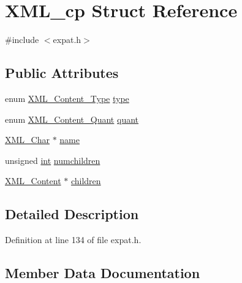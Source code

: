 \hypertarget{struct_x_m_l__cp}{}\section{X\+M\+L\+\_\+cp Struct Reference}
\label{struct_x_m_l__cp}


{\ttfamily \#include $<$expat.\+h$>$}

\subsection*{Public Attributes}
\begin{DoxyCompactItemize}
\item 
enum \hyperlink{amiga_2include_2libraries_2expat_8h_abb42ccef87efb634487d28753d14b473}{X\+M\+L\+\_\+\+Content\+\_\+\+Type} \hyperlink{struct_x_m_l__cp_a98deeadbd7d0e20387a29f9030c2a397}{type}
\item 
enum \hyperlink{amiga_2include_2libraries_2expat_8h_a63f73d88e3afb7c5fe7d33bbb193b024}{X\+M\+L\+\_\+\+Content\+\_\+\+Quant} \hyperlink{struct_x_m_l__cp_a85e6c8f3118df403b0d15491c93ae9e7}{quant}
\item 
\hyperlink{amiga_2include_2libraries_2expat_8h_a63da96463e775e1ec3a7d1f076208127}{X\+M\+L\+\_\+\+Char} $\ast$ \hyperlink{struct_x_m_l__cp_a248e745fb63bf4e13d475042d8170e3b}{name}
\item 
unsigned \hyperlink{xmltok_8h_a5a0d4a5641ce434f1d23533f2b2e6653}{int} \hyperlink{struct_x_m_l__cp_a5395f658297ee88a3ab45dfdbe389ef1}{numchildren}
\item 
\hyperlink{amiga_2include_2libraries_2expat_8h_a791d9e7de669ec5395df17978e1c507e}{X\+M\+L\+\_\+\+Content} $\ast$ \hyperlink{struct_x_m_l__cp_a06174d0e74f44cd8615ff9f4f6063481}{children}
\end{DoxyCompactItemize}


\subsection{Detailed Description}


Definition at line 134 of file expat.\+h.



\subsection{Member Data Documentation}
